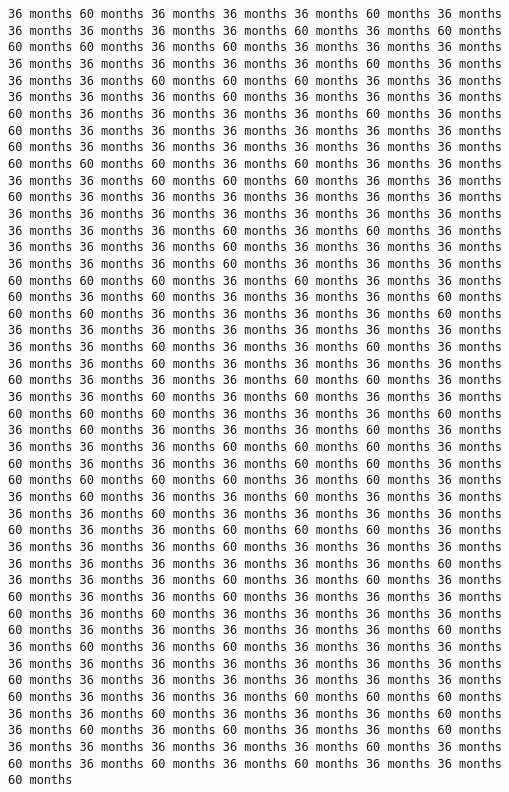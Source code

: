 \documentclass[11pt]{article}
\begin{document}
\begin{Verbatim}[commandchars=\\\{\}, frame=single, framerule=2mm, rulecolor=\color{outerrorbackground}]
36 months 60 months 36 months 36 months 36 months 60 months 36 months 36 months 36 months 36 months 36 months 60 months 36 months 60 months 60 months 60 months 36 months 60 months 36 months 36 months 36 months 36 months 36 months 36 months 36 months 36 months 60 months 36 months 36 months 36 months 60 months 60 months 60 months 36 months 36 months 36 months 36 months 36 months 60 months 36 months 36 months 36 months 60 months 36 months 36 months 36 months 36 months 60 months 36 months 60 months 36 months 36 months 36 months 36 months 36 months 36 months 60 months 36 months 36 months 36 months 36 months 36 months 36 months 60 months 60 months 60 months 36 months 60 months 36 months 36 months 36 months 36 months 60 months 60 months 60 months 36 months 36 months 60 months 36 months 36 months 36 months 36 months 36 months 36 months 36 months 36 months 36 months 36 months 36 months 36 months 36 months 36 months 36 months 36 months 60 months 36 months 60 months 36 months 36 months 36 months 36 months 60 months 36 months 36 months 36 months 36 months 36 months 36 months 60 months 36 months 36 months 36 months 60 months 60 months 60 months 36 months 60 months 36 months 36 months 60 months 36 months 60 months 36 months 36 months 36 months 60 months 60 months 60 months 36 months 36 months 36 months 36 months 60 months 36 months 36 months 36 months 36 months 36 months 36 months 36 months 36 months 36 months 60 months 36 months 36 months 60 months 36 months 36 months 36 months 60 months 36 months 36 months 36 months 36 months 60 months 36 months 36 months 36 months 60 months 60 months 36 months 36 months 36 months 60 months 36 months 60 months 36 months 36 months 60 months 60 months 60 months 36 months 36 months 36 months 60 months 36 months 60 months 36 months 36 months 36 months 60 months 36 months 36 months 36 months 36 months 60 months 60 months 60 months 36 months 60 months 36 months 36 months 36 months 60 months 60 months 36 months 60 months 60 months 60 months 60 months 36 months 60 months 36 months 36 months 60 months 36 months 36 months 60 months 36 months 36 months 36 months 36 months 60 months 36 months 36 months 36 months 36 months 60 months 36 months 36 months 60 months 60 months 60 months 36 months 36 months 36 months 36 months 60 months 36 months 36 months 36 months 36 months 36 months 36 months 36 months 36 months 36 months 60 months 36 months 36 months 36 months 60 months 36 months 60 months 36 months 60 months 36 months 36 months 60 months 36 months 36 months 36 months 60 months 36 months 60 months 36 months 36 months 36 months 36 months 60 months 36 months 36 months 36 months 36 months 36 months 60 months 36 months 60 months 36 months 60 months 36 months 36 months 36 months 36 months 36 months 36 months 36 months 36 months 36 months 36 months 60 months 36 months 36 months 36 months 36 months 36 months 36 months 60 months 36 months 36 months 36 months 60 months 60 months 60 months 36 months 36 months 60 months 36 months 36 months 36 months 60 months 36 months 60 months 36 months 60 months 36 months 36 months 60 months 36 months 36 months 36 months 36 months 36 months 60 months 36 months 60 months 36 months 60 months 36 months 60 months 36 months 36 months 60 months 
\end{Verbatim}
\end{document}
